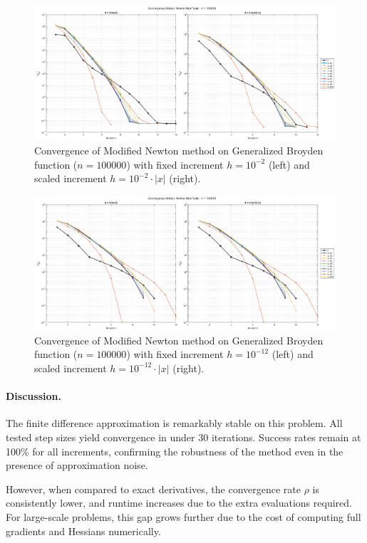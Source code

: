 \documentclass[a4paper,12pt]{article}
\begin{document}
	\newpage
	\begin{figure}[H]
		\centering
		\includegraphics[width=\textwidth]{../immagini/broyden_100k_h2.png}
		\caption{Convergence of Modified Newton method on Generalized Broyden function ($n=100000$) with fixed increment $h = 10^{-2}$ (left) and scaled increment $h = 10^{-2}\cdot|x|$ (right).}
		\label{fig:fd_broyden_100k_h2}
	\end{figure}
	
	\begin{figure}[htbp]
		\centering
		\includegraphics[width=\textwidth]{../immagini/broyden_100k_h12.png}
		\caption{Convergence of Modified Newton method on Generalized Broyden function ($n=100000$) with fixed increment $h = 10^{-12}$ (left) and scaled increment $h = 10^{-12}\cdot|x|$ (right).}
		\label{fig:fd_broyden_100k_h12}
	\end{figure}
	\newpage
	\paragraph{Discussion.}
	The finite difference approximation is remarkably stable on this problem. All tested step sizes yield convergence in under 30 iterations. Success rates remain at 100\% for all increments, confirming the robustness of the method even in the presence of approximation noise.
	
	However, when compared to exact derivatives, the convergence rate \( \rho \) is consistently lower, and runtime increases due to the extra evaluations required. For large-scale problems, this gap grows further due to the cost of computing full gradients and Hessians numerically.
	
\end{document}
